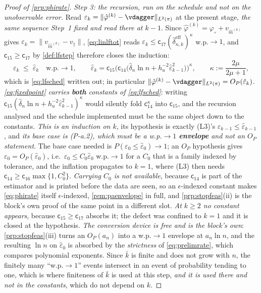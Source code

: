 \begin{proof}[Proof of \cref{prp:phirate}]
\emph{Step 3: the recursion, run on the schedule and not on the unobservable error.} Read
$\varepsilon_k=\|\hat\varphi^{(k)}-\vdagger\|_{L^{2}(\pi)}$ at the present stage, \emph{the same
sequence Step~1 fixed and read there at $k-1$}. Since
$\hat\varphi^{(k)}=\varphi_\circ+v_{\hat m^{(k)}}$ gives $\varepsilon_k=\|v_{\hat m^{(k)}}-v_\dagger\|$,
\eqref{eq:linlftot} reads $\varepsilon_k\le\mathsf c_{17}(\hat\delta^{\mathrm{eff}}_{n,k})^{\kappa}$
w.p.$\to1$, and $\mathsf c_{15}\ge\mathsf c_{17}$ by \cref{def:lfstep} therefore closes the induction:
\begin{equation}\label{eq:fixedpoint}
\varepsilon_k\;\le\;\hat\varepsilon_k\quad\text{w.p.}\to1,
\qquad
\hat\varepsilon_k=\mathsf c_{15}\Big(\mathsf c_{14}\big(\hat\delta_n\ln n+h_u^{-2}\hat\varepsilon_{k-1}^{2}\big)\Big)^{\kappa},
\qquad \kappa:=\frac{2\mu}{2\mu+1} ,
\end{equation}
which is \eqref{eq:lfsched} written out; in particular
$\|\hat\varphi^{(k)}-\vdagger\|_{L^{2}(\pi)}=O_P(\hat\varepsilon_k)$.
\emph{\eqref{eq:fixedpoint} carries \textbf{both} constants of \eqref{eq:lfsched}}: writing
$\mathsf c_{15}(\hat\delta_n\ln n+h_u^{-2}\hat\varepsilon_{k-1}^{2})^{\kappa}$ would silently fold
$\mathsf c_{14}^{\kappa}$ into $\mathsf c_{15}$, and the recursion analysed and the
schedule implemented must be the same object down to the constants.
\emph{This is an induction on $k$}, its hypothesis is exactly (L3)'s
$\varepsilon_{k-1}\le\hat\varepsilon_{k-1}$, and \emph{its base case is (P-a.2), which must be a
w.p.$\to1$ \textbf{envelope} and not an $O_P$ statement}. The base case needed is
$P(\varepsilon_0\le\hat\varepsilon_0)\to1$; an $O_P$ hypothesis gives $\varepsilon_0=O_P(\hat\varepsilon_0)$,
i.e.\ $\varepsilon_0\le C_0\hat\varepsilon_0$ w.p.$\to1$ for a $C_0$ that is a family indexed by
tolerance, and the inflation propagates to $k=1$, where (L3) then needs
$\mathsf c_{14}\ge\mathsf c_{16}\max\{1,C_0^{2}\}$. \emph{Carrying $C_0$ is not available}, because
$\mathsf c_{14}$ is part of the estimator and is printed before the data are seen, so an $\epsilon$-indexed
constant makes \eqref{eq:phirate} itself $\epsilon$-indexed, \cref{rem:paenvelope} in full, and
\cref{prp:stopfeas}(ii) is the block's own proof of the same point in a different slot. \emph{At $k\ge2$
no constant appears}, because $\mathsf c_{15}\ge\mathsf c_{17}$ absorbs it; the defect was confined to
$k=1$ and it is closed at the hypothesis. \emph{The conversion device is free and is the block's own}:
\cref{prp:stopfeas}(iii) turns an $O_P(a_n)$ into a w.p.$\to1$ envelope at $a_n\ln n$, and the resulting
$\ln n$ on $\hat\varepsilon_0$ is absorbed by the \emph{strictness} of \eqref{eq:prelimrate}, which
compares polynomial exponents. Since $\bar k$ is finite and does not grow with $n$, the finitely many
``w.p.$\to1$'' events intersect in an event of probability tending to one, which is where finiteness of
$\bar k$ is used at this step, \emph{and it is used there and not in the constants}, which do not
depend on $k$.


\end{proof}
